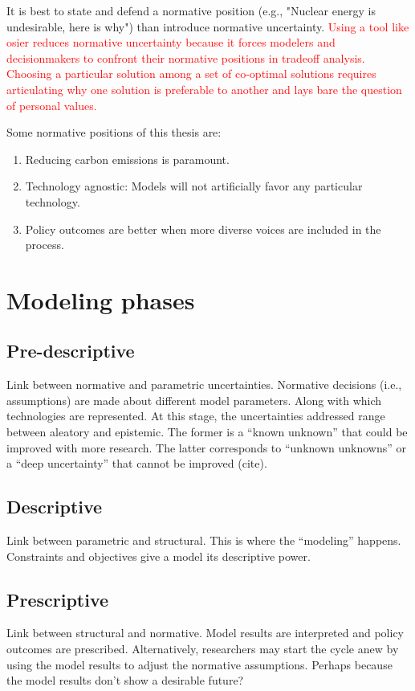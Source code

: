It is best to state and defend a normative position (e.g., "Nuclear energy is
undesirable, here is why") than introduce normative uncertainty.
\textcolor{red}{Using a tool like \ac{osier} reduces normative uncertainty
because it forces modelers and decisionmakers to confront their normative
positions in tradeoff analysis. Choosing a particular solution among a set of
co-optimal solutions requires articulating why one solution is preferable to
another and lays bare the question of personal values.}

Some normative positions of this thesis are:
\begin{enumerate}
    \item Reducing carbon emissions is paramount.
    \item Technology agnostic: Models will not artificially favor any particular technology.
    \item Policy outcomes are better when more diverse voices are included in the process.
\end{enumerate}

\section{Modeling phases}

\subsection{Pre-descriptive}

Link between normative and parametric uncertainties. Normative decisions (i.e., assumptions)
are made about different model parameters. Along with which technologies are represented.
At this stage, the uncertainties addressed range between aleatory and epistemic. The former 
is a ``known unknown'' that could be improved with more research. The latter corresponds to 
``unknown unknowns'' or a ``deep uncertainty'' that cannot be improved (cite).

\subsection{Descriptive}
Link between parametric and structural. This is where the ``modeling'' happens. Constraints
and objectives give a model its descriptive power.

\subsection{Prescriptive}
Link between structural and normative. Model results are interpreted and policy outcomes
are prescribed. Alternatively, researchers may start the cycle anew by using the model
results to adjust the normative assumptions. Perhaps because the model results don't show
a desirable future?




